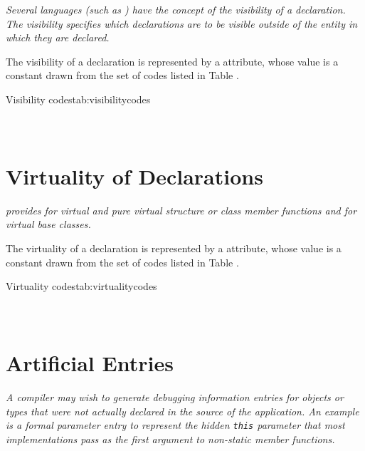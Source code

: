 \textit{Several languages (such as )
have the concept of the visibility of a declaration. The
visibility specifies which declarations are to be
visible outside of the entity in which they are
declared.}

The\hypertarget{chap:DWATvisibilityvisibilityofdeclaration}{}
visibility of a declaration is represented
by a \DWATvisibilityDEFN{}
attribute, whose value is a
constant drawn from the set of codes listed in
Table .

\begin{simplenametable}[1.5in]{Visibility codes}{tab:visibilitycodes}
\DWVISlocalTARG{}          \\
\DWVISexportedTARG{}    \\
\DWVISqualifiedTARG{}  \\
\end{simplenametable}

\section{Virtuality of Declarations}
\label{chap:virtualityofdeclarations}
\textit{ provides for virtual and pure virtual structure or class
member functions and for virtual base classes.}

The\hypertarget{chap:DWATvirtualityvirtualityindication}{}
virtuality of a declaration is represented by a
\DWATvirtualityDEFN{}
attribute, whose value is a constant drawn
from the set of codes listed in
Table .

\begin{simplenametable}[2.5in]{Virtuality codes}{tab:virtualitycodes}
\DWVIRTUALITYnoneTARG{}                      \\
\DWVIRTUALITYvirtualTARG{}                \\
\DWVIRTUALITYpurevirtualTARG{}    \\
\end{simplenametable}

\section{Artificial Entries}
\label{chap:artificialentries}
\textit{A compiler may wish to generate debugging information entries
for objects or types that were not actually declared in the
source of the application. An example is a formal parameter
entry to represent the hidden
\texttt{this} parameter
that most  implementations pass as the first argument
to non-static member functions.}

